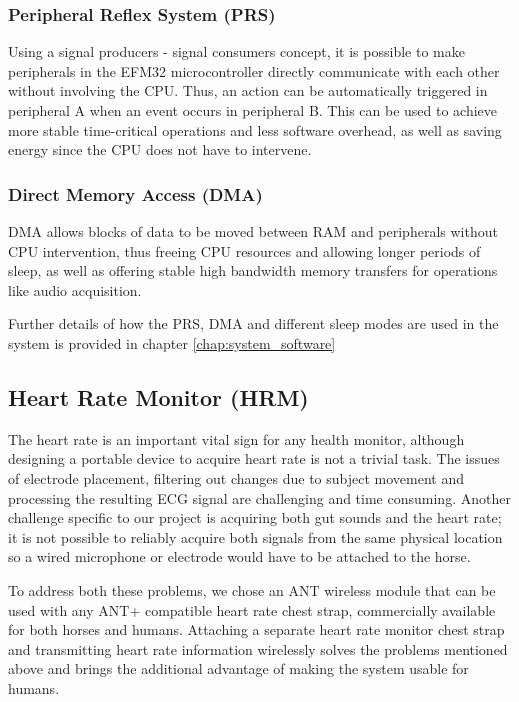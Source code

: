 \subsubsection*{Peripheral Reflex System (PRS)}
Using a signal producers - signal consumers concept, it is possible to make peripherals in the EFM32 microcontroller directly communicate with each other without involving the CPU. Thus, an action can be automatically triggered in peripheral A when an event occurs in peripheral B. This can be used to achieve more stable time-critical operations and less software overhead, as well as saving energy since the CPU does not have to intervene.

\subsubsection*{Direct Memory Access (DMA)} DMA allows blocks of data to be moved between RAM and peripherals without CPU intervention, thus freeing CPU resources and allowing longer periods of sleep, as well as offering stable high bandwidth memory transfers for operations like audio acquisition.

Further details of how the PRS, DMA and different sleep modes are used in the system is provided in chapter \ref{chap:system_software}


\subsection{Heart Rate Monitor (HRM)}
The heart rate is an important vital sign for any health monitor, although designing a portable device to acquire heart rate is not a trivial task. The issues of electrode placement, filtering out changes due to subject movement and processing the resulting ECG signal are challenging and time consuming. Another challenge specific to our project is acquiring both gut sounds and the heart rate; it is not possible to reliably acquire both signals from the same physical location so a wired microphone or electrode would have to be attached to the horse. 

To address both these problems, we chose an ANT wireless module that can be used with any ANT+ compatible heart rate chest strap, commercially available for both horses and humans. Attaching a separate heart rate monitor chest strap and transmitting heart rate information wirelessly solves the problems mentioned above and brings the additional advantage of making the system usable for humans.

